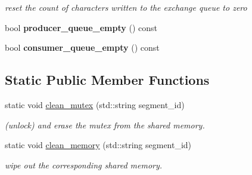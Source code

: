 \begin{DoxyCompactItemize}
\begin{DoxyCompactList}\small\item\em reset the count of characters written to the exchange queue to zero \end{DoxyCompactList}\item 
bool {\bfseries producer\+\_\+queue\+\_\+empty} () const \hypertarget{classshared__memory_1_1Exchange__manager__producer_a32172d2cbf30e1bcb2a45778063e6ff2}{}\label{classshared__memory_1_1Exchange__manager__producer_a32172d2cbf30e1bcb2a45778063e6ff2}

\item 
bool {\bfseries consumer\+\_\+queue\+\_\+empty} () const \hypertarget{classshared__memory_1_1Exchange__manager__producer_a208c79c39c9206b22aecb919eb0df87e}{}\label{classshared__memory_1_1Exchange__manager__producer_a208c79c39c9206b22aecb919eb0df87e}

\end{DoxyCompactItemize}
\subsection*{Static Public Member Functions}
\begin{DoxyCompactItemize}
\item 
static void \hyperlink{classshared__memory_1_1Exchange__manager__producer_af98fe4321e1fd280b509f5dfd2cf4a5b}{clean\+\_\+mutex} (std\+::string segment\+\_\+id)
\begin{DoxyCompactList}\small\item\em (unlock) and erase the mutex from the shared memory. \end{DoxyCompactList}\item 
static void \hyperlink{classshared__memory_1_1Exchange__manager__producer_a8574f4e075d6f755e567d21d04f24aab}{clean\+\_\+memory} (std\+::string segment\+\_\+id)
\begin{DoxyCompactList}\small\item\em wipe out the corresponding shared memory. \end{DoxyCompactList}\end{DoxyCompactItemize}
